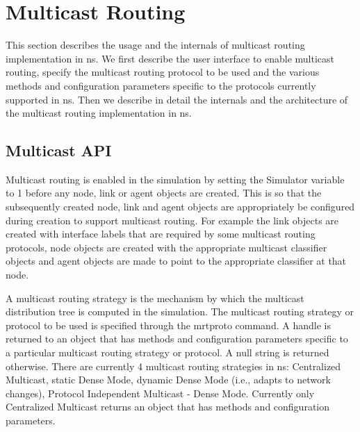 \chapter{Multicast Routing}
\label{chap:multicast}
This section describes the usage and the internals of multicast
routing implementation in ns.
We first describe the user interface to enable multicast routing,
specify the multicast routing protocol to be used and the
various methods and configuration parameters specific to the
protocols currently supported in ns.
Then we describe in detail the internals and the architecture of the
multicast routing implementation in ns.

\section{Multicast API}
\label{sec:mcast-api}
Multicast routing is enabled in the simulation by setting 
the  Simulator variable to 1
before any node, link or agent objects are created.
This is so that the subsequently created 
node, link and agent objects are appropriately
be configured during creation to support multicast routing.
For example the link objects are created with interface labels that
are required by some multicast routing protocols, 
node objects are created with the 
appropriate multicast classifier objects
and agent objects are made to point to the 
appropriate classifier at that node.

A multicast routing strategy is the mechanism by which
the multicast distribution tree
is computed in the simulation.
The multicast routing strategy or protocol
to be used is specified through the mrtproto command.
A handle is returned to an object that has 
methods and configuration parameters specific to a
particular multicast routing strategy or protocol.
A null string is returned otherwise.
There are currently 4 multicast routing strategies in ns: Centralized
Multicast, static Dense Mode, dynamic Dense Mode (i.e., adapts to
network changes), Protocol Independent Multicast - Dense Mode.
Currently only Centralized Multicast returns an object that has
methods and configuration parameters.

